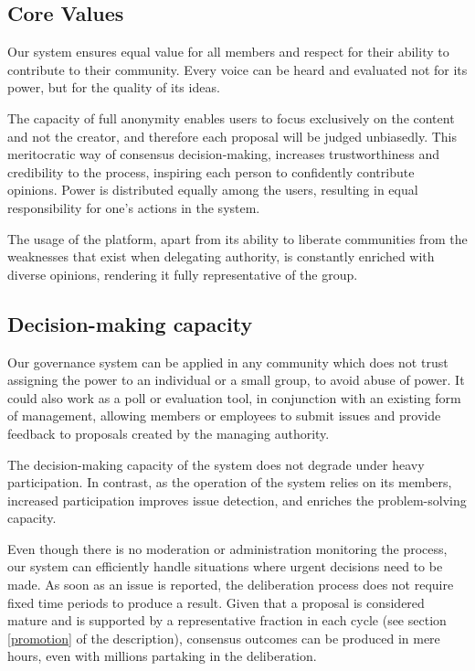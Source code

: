 \documentclass[a4paper,11pt]{article}
\begin{document}
\begin{multicols}{2}
\subsection{Core Values} \label{core}

Our system ensures equal value for all members and respect for their ability to contribute to their community. Every voice can be heard and evaluated not for its power, but for the quality of its ideas.

The capacity of full anonymity enables users to focus exclusively on the content and not the creator, and therefore each proposal will be judged unbiasedly. This meritocratic way of consensus decision-making, increases trustworthiness and credibility to the process, inspiring each person to confidently contribute opinions. Power is distributed equally among the users, resulting in equal responsibility for one's actions in the system. 

The usage of the platform, apart from its ability to liberate communities from the weaknesses that exist when delegating authority, is constantly enriched with diverse opinions, rendering it fully representative of the group.

\subsection{Decision-making capacity} \label{capacity}

Our governance system can be applied in any community which does not trust assigning the power to an individual or a small group, to avoid abuse of power. It could also work as a poll or evaluation tool, in conjunction with an existing form of management, allowing members or employees to submit issues and provide feedback to proposals created by the managing authority.

The decision-making capacity of the system does not degrade under heavy participation. In contrast, as the operation of the system relies on its members, increased participation improves issue detection, and enriches the problem-solving capacity.

Even though there is no moderation or administration monitoring the process, our system can efficiently handle situations where urgent decisions need to be made. As soon as an issue is reported, the deliberation process does not require fixed time periods to produce a result. Given that a proposal is considered mature and is supported by a representative fraction in each cycle (see section \ref{promotion} of the description), consensus outcomes can be produced in mere hours, even with millions partaking in the deliberation.


\end{multicols}
\end{document}
